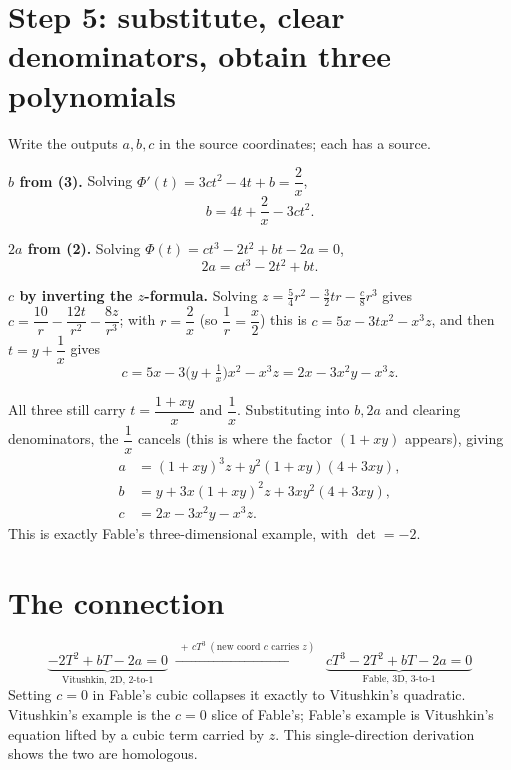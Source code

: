 \documentclass[11pt]{article}
\theoremstyle{plain}
\theoremstyle{definition}
\begin{document}
\section*{Step 5: substitute, clear denominators, obtain three polynomials}
Write the outputs $a,b,c$ in the source coordinates; each has a source.

\medskip\noindent\textbf{$b$ from (3).} Solving
$\Phi'(t)=3ct^2-4t+b=\dfrac2x$,
\[
  b = 4t+\frac2x-3ct^2 .
\]

\noindent\textbf{$2a$ from (2).} Solving $\Phi(t)=ct^3-2t^2+bt-2a=0$,
\[
  2a = ct^3-2t^2+bt .
\]

\noindent\textbf{$c$ by inverting the $z$-formula.} Solving
$z=\frac54r^2-\frac32tr-\frac c8r^3$ gives
$c=\dfrac{10}{r}-\dfrac{12t}{r^2}-\dfrac{8z}{r^3}$; with $r=\dfrac2x$ (so
$\dfrac1r=\dfrac x2$) this is $c=5x-3tx^2-x^3z$, and then $t=y+\dfrac1x$ gives
\[
  c = 5x-3\Big(y+\tfrac1x\Big)x^2-x^3z = 2x-3x^2y-x^3z .
\]

All three still carry $t=\dfrac{1+xy}{x}$ and $\dfrac1x$. Substituting into
$b,2a$ and clearing denominators, the $\dfrac1x$ cancels (this is where the
factor $(1+xy)$ appears), giving
\[
\begin{aligned}
  a &= (1+xy)^3z+y^2(1+xy)(4+3xy),\\
  b &= y+3x(1+xy)^2z+3xy^2(4+3xy),\\
  c &= 2x-3x^2y-x^3z .
\end{aligned}
\]
This is exactly Fable's three-dimensional example, with $\det=-2$.

\section*{The connection}
\[
  \underbrace{-2T^2+bT-2a=0}_{\text{Vitushkin, 2D, }2\text{-to-}1}
  \;\xrightarrow{\;+\,cT^3\ (\text{new coord }c\text{ carries }z)\;}\;
  \underbrace{cT^3-2T^2+bT-2a=0}_{\text{Fable, 3D, }3\text{-to-}1}
\]
Setting $c=0$ in Fable's cubic collapses it exactly to Vitushkin's
quadratic. Vitushkin's example is the $c=0$ slice of Fable's; Fable's example
is Vitushkin's equation lifted by a cubic term carried by $z$. This
single-direction derivation shows the two are homologous.

\end{document}
